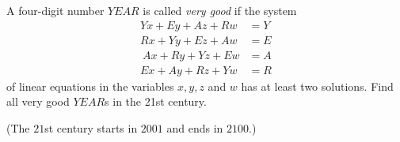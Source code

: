 A four-digit number $YEAR$ is called \textit{very good} if the system
\begin{align*}
Yx+Ey+Az+Rw& =Y\\
Rx+Yy+Ez+Aw & = E\\\
Ax+Ry+Yz+Ew & = A\\
Ex+Ay+Rz+Yw &= R
\end{align*}of linear equations in the variables $x,y,z$ and $w$ has at least two solutions. Find all very good $YEAR$s in the 21st century.

(The $21$st century starts in $2001$ and ends in $2100$.)

